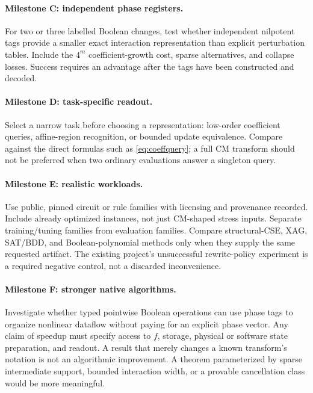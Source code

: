 \paragraph{Milestone C: independent phase registers.}
For two or three labelled Boolean changes, test whether independent nilpotent tags provide a smaller exact interaction representation than explicit perturbation tables. Include the $4^m$ coefficient-growth cost, sparse alternatives, and collapse losses. Success requires an advantage after the tags have been constructed and decoded.

\paragraph{Milestone D: task-specific readout.}
Select a narrow task before choosing a representation: low-order coefficient queries, affine-region recognition, or bounded update equivalence. Compare against the direct formulas such as \cref{eq:coeffquery}; a full CM transform should not be preferred when two ordinary evaluations answer a singleton query.

\paragraph{Milestone E: realistic workloads.}
Use public, pinned circuit or rule families with licensing and provenance recorded. Include already optimized instances, not just CM-shaped stress inputs. Separate training/tuning families from evaluation families. Compare structural-CSE, XAG, SAT/BDD, and Boolean-polynomial methods only when they supply the same requested artifact. The existing project's unsuccessful rewrite-policy experiment is a required negative control, not a discarded inconvenience.

\paragraph{Milestone F: stronger native algorithms.}
Investigate whether typed pointwise Boolean operations can use phase tags to organize nonlinear dataflow without paying for an explicit phase vector. Any claim of speedup must specify access to $f$, storage, physical or software state preparation, and readout. A result that merely changes a known transform's notation is not an algorithmic improvement. A theorem parameterized by sparse intermediate support, bounded interaction width, or a provable cancellation class would be more meaningful.


